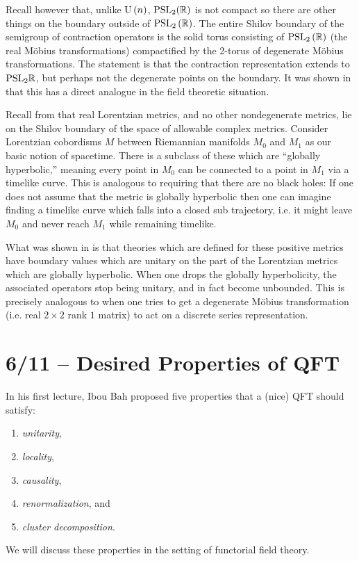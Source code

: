 Recall however that, unlike $\mathrm{U}\left(n\right)$, $\mathrm{PSL}_2(\mathbb{R})$ is not compact so there are
other things on the boundary outside of $\mathrm{PSL}_2\left(\mathbb{R}\right)$. 
The entire Shilov boundary of the semigroup of contraction operators is the solid torus
consisting of $\mathrm{PSL}_2\left(\mathbb{R}\right)$ (the real M\"obius
transformations) compactified by the 2-torus of degenerate M\"obius transformations. 
The statement is that the contraction representation extends to $\mathrm{PSL}_2 \mathbb{R}$, but perhaps
not the degenerate points on the boundary. 
It was shown in \cite{KS} that this has a direct analogue in the field theoretic situation.

Recall from  that real Lorentzian metrics, and no other
nondegenerate metrics, lie on the Shilov boundary of the space of allowable complex
metrics. 
Consider Lorentzian cobordisms $M$ between Riemannian manifolds $M_0$ and $M_1$
as our basic notion of spacetime. There is a subclass of these which are ``globally
hyperbolic,'' meaning every point in 
$M_0$ can be connected to a point in $M_1$ via a timelike curve.
This is analogous to requiring that there are no black holes:
If one does not assume that the metric is globally hyperbolic then
one can imagine finding a timelike curve which falls into a 
closed sub trajectory, i.e. it might leave $M_0$ and never reach $M_1$ while remaining
timelike. 

What was shown in \cite{KS} is that theories which are defined for these 
positive metrics have boundary values which are unitary on the part of the Lorentzian
metrics which are globally hyperbolic.
When one drops the globally hyperbolicity, the associated operators stop being unitary,
and in fact become unbounded. 
This is precisely analogous to when one tries to get a 
degenerate M\"obius transformation (i.e. real $2\times 2$ rank $1$ matrix) 
to act on a discrete series representation. 

\section{6/11 -- Desired Properties of QFT}

In his first lecture, Ibou Bah proposed five properties that a (nice) QFT should satisfy:
\begin{enumerate}[label = (\roman*)]
\item \emph{unitarity}, 
\item \emph{locality}, 
\item \emph{causality}, 
\item \emph{renormalization}, and
\item \emph{cluster decomposition}.
\end{enumerate}
We will discuss these properties in the setting of functorial field theory. 

